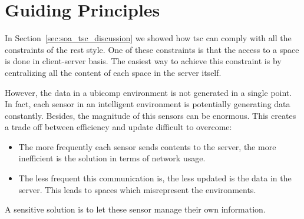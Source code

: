 \section{Guiding Principles} %
\label{sec:guiding_principles}

In Section~\ref{sec:soa_tsc_discussion} we showed how \ac{tsc} can comply with all the constraints of the \ac{rest} style.
One of these constraints is that the access to a space is done in client-server basis.
The easiest way to achieve this constraint is by centralizing all the content of each space in the server itself.


However, the data in a \ac{ubicomp} environment is not generated in a single point.
In fact, each sensor in an intelligent environment is potentially generating data constantly.
Besides, the magnitude of this sensors can be enormous.
This creates a trade off between efficiency and update difficult to overcome:
\begin{itemize}
  \item The more frequently each sensor sends contents to the server, the more inefficient is the solution in terms of network usage.
  \item The less frequent this communication is, the less updated is the data in the server.
        This leads to spaces which misrepresent the environments.
\end{itemize}
A sensitive solution is to let these sensor manage their own information.


